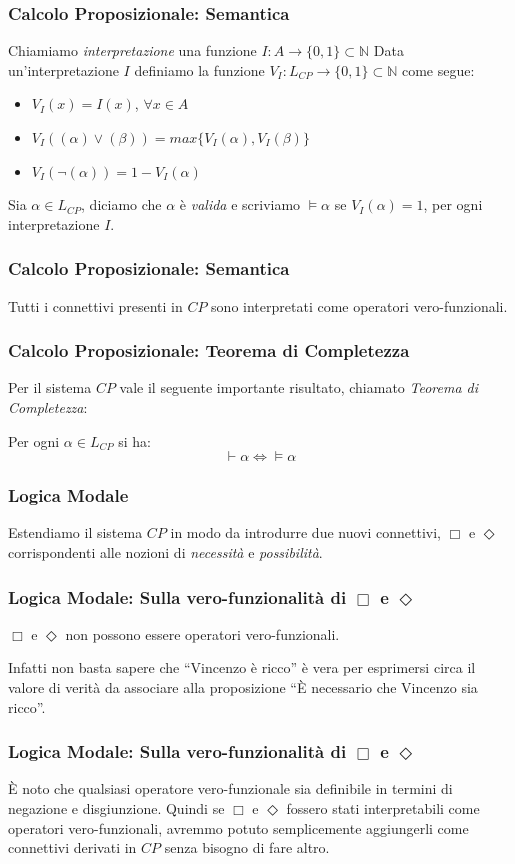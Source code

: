 \documentclass[notheorem,aspectratio=169]{beamer}
\begin{document}
\begin{frame}
\frametitle{Calcolo Proposizionale: Semantica}
Chiamiamo \emph{interpretazione} una funzione $I : A \to \{0, 1\} \subset \mathbb{N}$
Data un'interpretazione $I$ definiamo la funzione $V_I : L_{CP} \to \{0, 1\} \subset \mathbb{N}$
come segue:
\begin{itemize}
\item $V_I(x) = I(x)$, $\forall x \in A$
\item $V_I((\alpha) \lor (\beta)) = max\{V_I(\alpha), V_I(\beta)\}$
\item $V_I(\neg (\alpha)) = 1 - V_I(\alpha)$
\end{itemize}

Sia $\alpha \in L_{CP}$, diciamo che $\alpha$ è \emph{valida} e scriviamo $\vDash \alpha$ se
$V_I(\alpha) = 1$, per ogni interpretazione $I$.
\end{frame}

\begin{frame}
\frametitle{Calcolo Proposizionale: Semantica}
Tutti i connettivi presenti in $CP$ sono interpretati come operatori vero-funzionali.
\end{frame}

\begin{frame}
\frametitle{Calcolo Proposizionale: Teorema di Completezza}
Per il sistema $CP$ vale il seguente importante risultato, chiamato
\emph{Teorema di Completezza}:

Per ogni $\alpha \in L_{CP}$ si ha:
$$\vdash \alpha \Leftrightarrow \vDash \alpha$$
\end{frame}

\begin{frame}
\frametitle{Logica Modale}
Estendiamo il sistema $CP$ in modo da introdurre due nuovi connettivi, $\Box$
e $\Diamond$ corrispondenti alle nozioni di \emph{necessità} e \emph{possibilità}.
\end{frame}

\begin{frame}
\frametitle{Logica Modale: Sulla vero-funzionalità di $\Box$ e $\Diamond$}
$\Box$ e $\Diamond$ non possono essere operatori vero-funzionali.

Infatti non basta sapere che ``Vincenzo è ricco'' è vera per esprimersi
circa il valore di verità da associare alla proposizione ``È necessario che Vincenzo sia ricco''.
\end{frame}


\begin{frame}
\frametitle{Logica Modale: Sulla vero-funzionalità di $\Box$ e $\Diamond$}
È noto che qualsiasi operatore vero-funzionale sia definibile in termini
di negazione e disgiunzione. Quindi se $\Box$ e $\Diamond$ fossero stati interpretabili
come operatori vero-funzionali, avremmo potuto semplicemente aggiungerli come connettivi
derivati in $CP$ senza bisogno di fare altro.

\end{frame}
\end{document}
